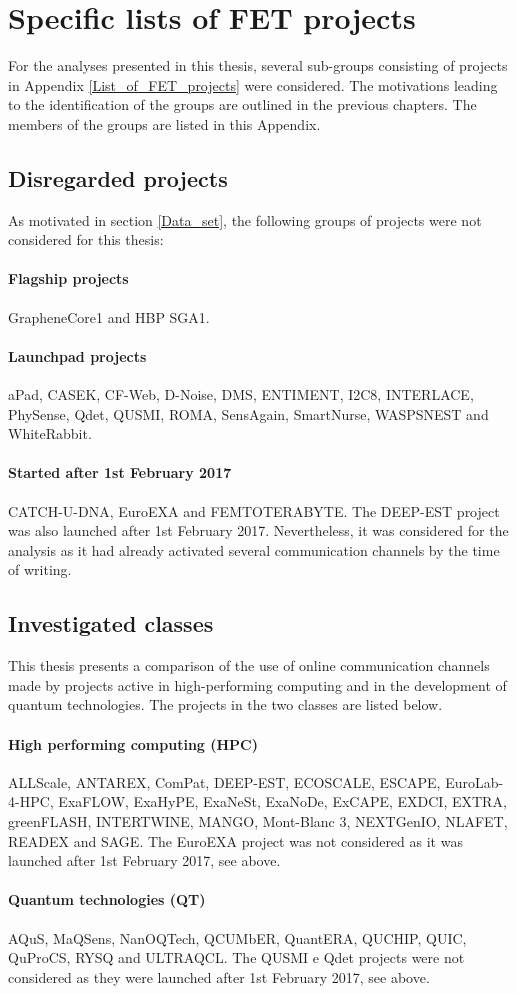 \chapter{Specific lists of FET projects} \label{Specific_lists_of_FET_projects}
For the analyses presented in this thesis, several sub-groups consisting of projects in Appendix \ref{List_of_FET_projects} were considered. The motivations leading to the identification of the groups are outlined in the previous chapters. The members of the groups are listed in this Appendix.

\section{Disregarded projects}
As motivated in section \ref{Data_set}, the following groups of projects were not considered for this thesis:

\subsubsection{Flagship projects}
GrapheneCore1 and HBP SGA1.

\subsubsection{Launchpad projects}
aPad, CASEK, CF-Web, D-Noise, DMS, ENTIMENT, I2C8, INTERLACE, PhySense, Qdet, QUSMI, ROMA, SensAgain, SmartNurse, WASPSNEST and WhiteRabbit.

\subsubsection{Started after 1st February 2017}
CATCH-U-DNA, EuroEXA and FEMTOTERABYTE. The DEEP-EST project was also launched after 1st February 2017. Nevertheless, it was considered for the analysis as it had already activated several communication channels by the time of writing.

\section{Investigated classes}
This thesis presents a comparison of the use of online communication channels made by projects active in high-performing computing and in the development of quantum technologies. The projects in the two classes are listed below. 

\subsubsection{High performing computing (HPC)}
ALLScale, ANTAREX, ComPat, DEEP-EST, ECOSCALE, ESCAPE, EuroLab-4-HPC, ExaFLOW, ExaHyPE, ExaNeSt, ExaNoDe, ExCAPE, EXDCI, EXTRA, greenFLASH, INTERTWINE, MANGO, Mont-Blanc 3, NEXTGenIO, NLAFET, READEX and SAGE. The  EuroEXA project was not considered as it was launched after 1st February 2017, see above.

\subsubsection{Quantum technologies (QT)}
AQuS, MaQSens, NanOQTech, QCUMbER, QuantERA, QUCHIP, QUIC, QuProCS, RYSQ and ULTRAQCL. The QUSMI e Qdet projects were not considered as they were launched after 1st February 2017, see above.